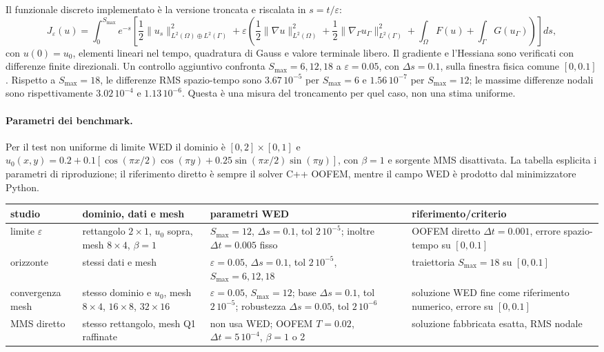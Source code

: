 \documentclass[10pt,a4paper]{article}
\begin{document}
Il funzionale discreto implementato è la versione troncata e riscalata in $s=t/\varepsilon$:
\[
J_\varepsilon(u)=\int_0^{S_{\max}} e^{-s}\left[\frac12\|u_s\|^2_{L^2(\Omega)\oplus L^2(\Gamma)}
 +\varepsilon\left(\frac12\|\nabla u\|^2_{L^2(\Omega)}+\frac12\|\nabla_\Gamma u_\Gamma\|^2_{L^2(\Gamma)}
 +\int_\Omega F(u)+\int_\Gamma G(u_\Gamma)\right)\right]ds,
\]
con $u(0)=u_0$, elementi lineari nel tempo, quadratura di Gauss e valore terminale libero. Il gradiente e l'Hessiana sono verificati con differenze finite direzionali. Un controllo aggiuntivo confronta $S_{\max}=6,12,18$ a $\varepsilon=0.05$, con $\Delta s=0.1$, sulla finestra fisica comune $[0,0.1]$. Rispetto a $S_{\max}=18$, le differenze RMS spazio-tempo sono $3.67\,10^{-5}$ per $S_{\max}=6$ e $1.56\,10^{-7}$ per $S_{\max}=12$; le massime differenze nodali sono rispettivamente $3.02\,10^{-4}$ e $1.13\,10^{-6}$. Questa è una misura del troncamento per quel caso, non una stima uniforme.

\paragraph{Parametri dei benchmark.} Per il test non uniforme di limite WED il dominio è $[0,2]\times[0,1]$ e $u_0(x,y)=0.2+0.1[\cos(\pi x/2)\cos(\pi y)+0.25\sin(\pi x/2)\sin(\pi y)]$, con $\beta=1$ e sorgente MMS disattivata. La tabella esplicita i parametri di riproduzione; il riferimento diretto è sempre il solver C++ OOFEM, mentre il campo WED è prodotto dal minimizzatore Python.
\begin{center}\small
\begin{tabular}{p{2.5cm}p{3.0cm}p{3.8cm}p{4.2cm}}
\toprule
studio & dominio, dati e mesh & parametri WED & riferimento/criterio\\
\midrule
limite $\varepsilon$ & rettangolo $2\times1$, $u_0$ sopra, mesh $8\times4$, $\beta=1$ & $S_{\max}=12$, $\Delta s=0.1$, tol $2\,10^{-5}$; inoltre $\Delta t=0.005$ fisso & OOFEM diretto $\Delta t=0.001$, errore spazio-tempo su $[0,0.1]$\\
orizzonte & stessi dati e mesh & $\varepsilon=0.05$, $\Delta s=0.1$, tol $2\,10^{-5}$, $S_{\max}=6,12,18$ & traiettoria $S_{\max}=18$ su $[0,0.1]$\\
convergenza mesh & stesso dominio e $u_0$, mesh $8\times4$, $16\times8$, $32\times16$ & $\varepsilon=0.05$, $S_{\max}=12$; base $\Delta s=0.1$, tol $2\,10^{-5}$; robustezza $\Delta s=0.05$, tol $2\,10^{-6}$ & soluzione WED fine come riferimento numerico, errore su $[0,0.1]$\\
MMS diretto & stesso rettangolo, mesh Q1 raffinate & non usa WED; OOFEM $T=0.02$, $\Delta t=5\,10^{-4}$, $\beta=1$ o 2 & soluzione fabbricata esatta, RMS nodale\\
\bottomrule
\end{tabular}
\end{center}
\end{document}
